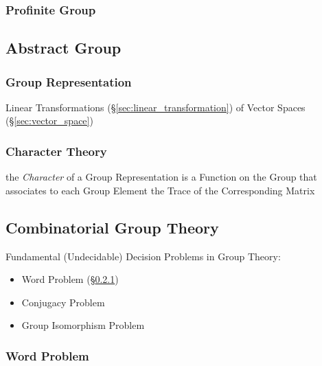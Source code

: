 \subsubsection{Profinite Group}\label{sec:profinite_group}



\subsection{Abstract Group}\label{sec:abstract_group}

\subsubsection{Group Representation}\label{sec:group_representation}

Linear Transformations (\S\ref{sec:linear_transformation}) of Vector Spaces
(\S\ref{sec:vector_space})



\subsubsection{Character Theory}\label{sec:character_theory}

the \emph{Character} of a Group Representation is a Function on the Group that
associates to each Group Element the Trace of the Corresponding Matrix



\subsection{Combinatorial Group Theory}\label{sec:combinatorial_group_theory}

Fundamental (Undecidable) Decision Problems in Group Theory:
\begin{itemize}
  \item Word Problem (\S\ref{sec:word_problem})
  \item Conjugacy Problem
  \item Group Isomorphism Problem
\end{itemize}



\subsubsection{Word Problem}\label{sec:word_problem}

